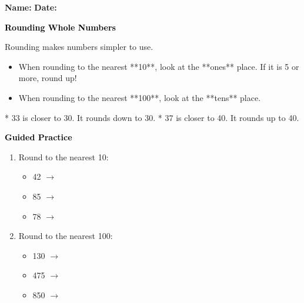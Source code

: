 \documentclass[12pt, letterpaper, fleqn]{article}
\newcommand{\blank}{\underline{\hspace{2.2cm}}}
\begin{document}
\textbf{Name:} \underline{\hspace{5cm}}
\hfill
\textbf{Date:} \underline{\hspace{3cm}}\\

\begin{tcolorbox}[colback=customteal!20]
    \large\textcolor{black}{\textbf{Rounding Whole Numbers}}
\end{tcolorbox}

\vspace{3mm}
\noindent
Rounding makes numbers simpler to use.
\begin{itemize}
    \item When rounding to the nearest **10**, look at the **ones** place. If it is 5 or more, round up!
    \item When rounding to the nearest **100**, look at the **tens** place.
\end{itemize}

\vspace{3mm}
\begin{center}
\end{center}
* 33 is closer to 30. It rounds down to 30.
* 37 is closer to 40. It rounds up to 40.

\newpage
\begin{tcolorbox}[colback=customteal!20]
    \large\textcolor{black}{\textbf{Guided Practice}}
\end{tcolorbox}

\vspace{5mm}
\begin{enumerate}[itemsep=2.5cm, leftmargin=0.6cm]
\item Round to the nearest 10:
  \begin{itemize}[itemsep=0.8cm]
    \item 42 $\rightarrow$ \blank
    \item 85 $\rightarrow$ \blank
    \item 78 $\rightarrow$ \blank
  \end{itemize}

\item Round to the nearest 100:
  \begin{itemize}[itemsep=0.8cm]
    \item 130 $\rightarrow$ \blank
    \item 475 $\rightarrow$ \blank
    \item 850 $\rightarrow$ \blank
  \end{itemize}
\end{enumerate}
\end{document}
